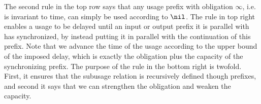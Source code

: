 The second rule in the top row says that any usage prefix with obligation $\infty$, i.e. is invariant to time, can simply be used according to $\nil$. The rule in top right enables a usage to be delayed until an input or output prefix it is parallel with has synchronized, by instead putting it in parallel with the continuation of this prefix. Note that we advance the time of the usage according to the upper bound of the imposed delay, which is exactly the obligation plus the capacity of the synchronizing prefix. The purpose of the rule in the bottom right is twofold. First, it ensures that the subusage relation is recursively defined though prefixes, and second it says that we can strengthen the obligation and weaken the capacity.

